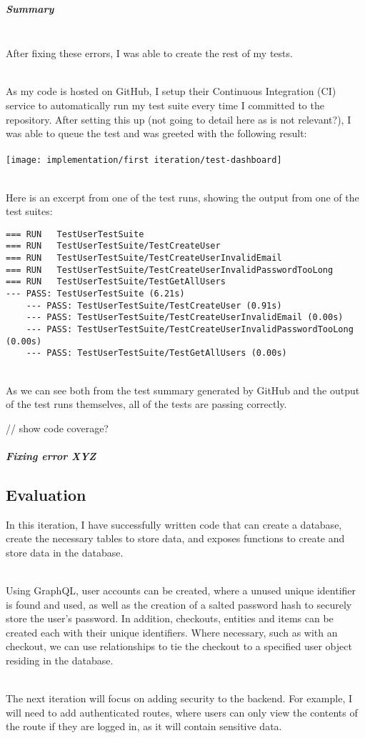 \documentclass[../../main.tex]{subfiles}
\begin{document}
\subparagraph{Summary}

\noindent \\ After fixing these errors, I was able to create the rest of my tests.

\noindent \\ As my code is hosted on GitHub, I setup their Continuous Integration (CI) service to automatically run my test suite every time I committed to the repository. After setting this up (not going to detail here as is not relevant?), I was able to queue the test and was greeted with the following result: \\\\

\texttt{[image: implementation/first iteration/test-dashboard]}

\noindent \\ Here is an excerpt from one of the test runs, showing the output from one of the test suites:

\begin{lstlisting}
=== RUN   TestUserTestSuite
=== RUN   TestUserTestSuite/TestCreateUser
=== RUN   TestUserTestSuite/TestCreateUserInvalidEmail
=== RUN   TestUserTestSuite/TestCreateUserInvalidPasswordTooLong
=== RUN   TestUserTestSuite/TestGetAllUsers
--- PASS: TestUserTestSuite (6.21s)
    --- PASS: TestUserTestSuite/TestCreateUser (0.91s)
    --- PASS: TestUserTestSuite/TestCreateUserInvalidEmail (0.00s)
    --- PASS: TestUserTestSuite/TestCreateUserInvalidPasswordTooLong (0.00s)
    --- PASS: TestUserTestSuite/TestGetAllUsers (0.00s)
\end{lstlisting}

\noindent \\ As we can see both from the test summary generated by GitHub and the output of the test runs themselves, all of the tests are passing correctly.

// show code coverage?

\subparagraph{Fixing error XYZ}

\subsection{Evaluation}

\noindent In this iteration, I have successfully written code that can create a database, create the necessary tables to store data, and exposes functions to create and store data in the database.

\noindent \\ Using GraphQL, user accounts can be created, where a unused unique identifier is found and used, as well as the creation of a salted password hash to securely store the user's password. In addition, checkouts, entities and items can be created each with their unique identifiers. Where necessary, such as with an checkout, we can use relationships to tie the checkout to a specified user object residing in the database.

\noindent \\ The next iteration will focus on adding security to the backend. For example, I will need to add authenticated routes, where users can only view the contents of the route if they are logged in, as it will contain sensitive data.
\end{document}
